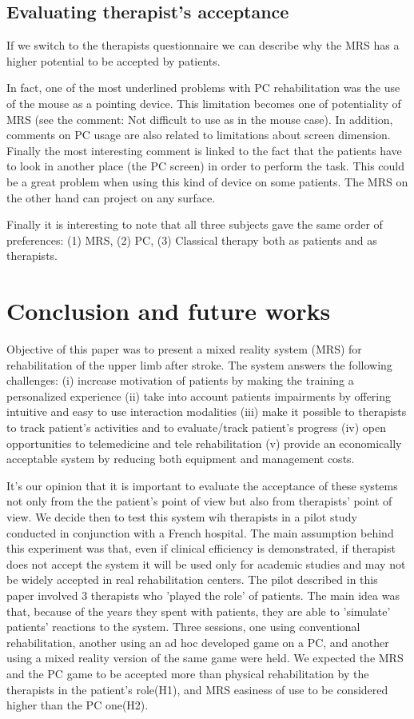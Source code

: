 \documentclass[preprint,authoryear,12pt]{elsarticle}
\begin{document}
\subsection{Evaluating therapist's acceptance}
\label{Therapist}
If we switch to the therapists questionnaire we can describe why the MRS has a higher potential to be accepted by patients. 

In fact, one of the most underlined problems with PC rehabilitation was the use of the mouse as a pointing device. This limitation becomes one of potentiality of MRS (see the comment: Not difficult to use as in the mouse case). In addition, comments on PC usage are also related to limitations about screen dimension. Finally the most interesting comment is linked to the fact that the patients have to look in another place (the PC screen) in order to perform the task. This could be a great problem when using this kind of device on some patients. The MRS on the other hand can project on any surface. 

Finally it is interesting to note that all three subjects gave the same order of preferences: (1) MRS, (2) PC, (3) Classical therapy both as patients and as therapists.


\section{Conclusion and future works}
\label{conclusion}

Objective of this paper was to present a mixed reality system (MRS) for rehabilitation of the upper limb after stroke. The system answers the following challenges:
(i) increase motivation of patients by making the training a personalized experience 
(ii) take into account patients impairments by offering intuitive and easy to use interaction modalities 
(iii) make it possible to therapists to track patient's activities and to evaluate/track patient's progress  (iv) open opportunities to telemedicine and tele rehabilitation 
(v) provide an economically acceptable system by reducing both equipment and management costs. 

It's our opinion that it is important to evaluate the acceptance of these systems not only from the the patient's point of view but also from therapists' point of view. We decide then to test this system wih therapists in a pilot study conducted in conjunction with a French hospital. The main assumption behind this experiment was that, even if clinical efficiency is demonstrated, if therapist does not accept the system it will be used only for academic studies and may not be widely accepted in real rehabilitation centers.  The pilot described in this paper involved 3 therapists who 'played the role' of  patients. The main idea was that, because of the years they spent with patients, they are able to 'simulate' patients' reactions to the system.
Three sessions, one using conventional rehabilitation, another using an ad hoc developed game on a PC, and another using a mixed reality version of the same game were held.  We expected the MRS and the PC game to be accepted more than physical rehabilitation by the therapists in the patient's role(H1), and MRS easiness of use to be considered higher than the PC one(H2). 
\end{document}
